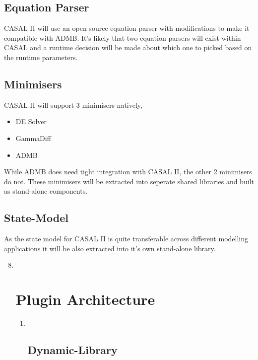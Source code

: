 \documentclass[a4paper,11pt,twoside,pdftex,draft]{article}
\begin{document}
\hypertarget{equation-parser}{%
\subsection{Equation Parser}\label{equation-parser}}

CASAL II will use an open source equation parser with modifications to
make it compatible with ADMB. It's likely that two equation parsers will
exist within CASAL and a runtime decision will be made about which one
to picked based on the runtime parameters.

\hypertarget{minimisers}{%
\subsection{Minimisers}\label{minimisers}}

CASAL II will support 3 minimisers natively,

\begin{itemize}
\item
  DE Solver
\item
  GammaDiff
\item
  ADMB
\end{itemize}

While ADMB does need tight integration with CASAL II, the other 2
minimisers do not. These minimisers will be extracted into seperate
shared libraries and built as stand-alone components.

\hypertarget{state-model}{%
\subsection{State-Model}\label{state-model}}

As the state model for CASAL II is quite transferable across different
modelling applications it will be also extracted into it's own
stand-alone library.

\begin{enumerate}
\setcounter{enumi}{7}
\item ~
  \hypertarget{plugin-architecture}{%
  \section{Plugin Architecture}\label{plugin-architecture}}

  \begin{enumerate}
  \item ~
    \hypertarget{dynamic-library}{%
    \subsection{Dynamic-Library}\label{dynamic-library}}
  \end{enumerate}
\end{enumerate}
\end{document}
